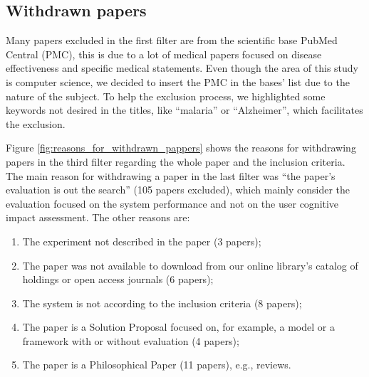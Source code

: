\subsection{Withdrawn papers}
\label{subsec:results-slr-withdrawal-papers}

Many papers excluded in the first filter are from the scientific base PubMed Central (\gls{PMC}), this is due to a lot of medical papers focused on disease effectiveness and specific medical statements. Even though the area of this study is computer science, we decided to insert the \gls{PMC} in the bases’ list due to the nature of the subject. To help the exclusion process, we highlighted some keywords not desired in the titles, like ``malaria'' or ``Alzheimer'', which facilitates the exclusion. 

Figure \ref{fig:reasons_for_withdrawn_pappers} shows the reasons for withdrawing papers in the third filter regarding the whole paper and the inclusion criteria. The main reason for withdrawing a paper in the last filter was ``the paper’s evaluation is out the search'' (105 papers excluded), which mainly consider the evaluation focused on the system performance and not on the user cognitive impact assessment. The other reasons are: 
        \begin{enumerate}
            \item The experiment not described in the paper (3 papers);
            \item The paper was not available to download from our online library's catalog of holdings or open access journals (6 papers);
            \item The system is not according to the inclusion criteria (8 papers);
            \item The paper is a Solution Proposal \cite{Petersen2008} focused on, for example, a model or a framework with or without evaluation (4 papers);
            \item The paper is a Philosophical Paper \cite{Petersen2008} (11 papers), e.g., reviews. 
        \end{enumerate}

 	\begin{figure}[h] 
   	    \captionsetup{width=12cm}%
	\end{figure}

